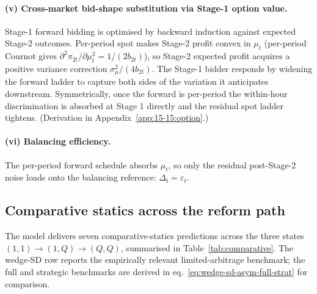 \documentclass[11pt]{article}
\begin{document}
\paragraph{(v) Cross-market bid-shape substitution via Stage-1 option value.} Stage-1 forward bidding is optimised by backward induction against expected Stage-2 outcomes. Per-period spot makes Stage-2 profit convex in $\mu_t$ (per-period Cournot gives $\partial^2 \pi_{2t}/\partial \mu_t^2 = 1/(2 b_{2t})$), so Stage-2 expected profit acquires a positive variance correction $\sigma_\mu^2 / (4 b_{2t})$. The Stage-1 bidder responds by widening the forward ladder to capture both sides of the variation it anticipates downstream. Symmetrically, once the forward is per-period the within-hour discrimination is absorbed at Stage 1 directly and the residual spot ladder tightens. (Derivation in Appendix~\ref{app:15-15:option}.)

\paragraph{(vi) Balancing efficiency.} The per-period forward schedule absorbs $\mu_t$, so only the residual post-Stage-2 noise loads onto the balancing reference: $\Delta_t = \varepsilon_t$.

\subsection{Comparative statics across the reform path}\label{sec:speaks}

The model delivers seven comparative-statics predictions across the three states $(1,1) \to (1,Q) \to (Q,Q)$, summarised in Table~\ref{tab:comparative}. The wedge-SD row reports the empirically relevant limited-arbitrage benchmark; the full and strategic benchmarks are derived in eq.~\eqref{eq:wedge-sd-asym-full-strat} for comparison.
\end{document}
